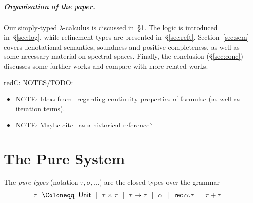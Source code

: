 \documentclass[%
  a4paper,
  UKenglish,
  cleveref,
  autoref,
  thm-restate,
  numberwithinsect,
]{lipics-v2021}
\newcommand\bnf\Coloneqq
\newcommand\gs{~~|~~}
\newcommand\term[1]{\mathsf{#1}}
\newcommand\type[1]{\term{#1}}
\newcommand\arrow\to
\newcommand\Unit{\type{Unit}}
\newcommand\rec{\mathop{\type{rec}}}	%
\newcommand\TV{\alpha}		%
\newcommand\PT{\tau}		%
\newcommand\PTbis{\sigma}	%
\newenvironment{colinpar}{\begin{color}{red}\sffamily C:}{\end{color}}
\begin{document}
\subparagraph{Organisation of the paper.}
Our simply-typed $\lambda$-calculus is discussed in~\S\ref{sec:pure}.
The logic is introduced in~\S\ref{sec:log},
while refinement types are presented in~\S\ref{sec:reft}.
Section~\ref{sec:sem} covers denotational semantics,
soundness and positive completeness,
as well as some necessary material on spectral spaces.
Finally, the conclusion (\S\ref{sec:conc}) discusses some further works
and compare with more related works.
%
%





\begin{colinpar}
NOTES/TODO:
\begin{itemize}
\item NOTE: Ideas from~\cite{jr21esop}
regarding continuity properties of formulae (as well as iteration terms).

\item NOTE: Maybe cite~\cite{smyth83icalp} as a historical reference?.
\end{itemize}
\end{colinpar}



\section{The Pure System}
\label{sec:pure}


The \emph{pure types}
(notation $\PT,\PTbis,\dots$) are
the closed types over the grammar
\[
\begin{array}{r @{~~} c @{~~} l}
    \PT
&   \bnf
&   \Unit
\gs \PT \times \PT
\gs \PT \arrow \PT
\gs \TV
\gs \rec \TV.\PT 
\gs \PT + \PT
\end{array}
\]
\end{document}
